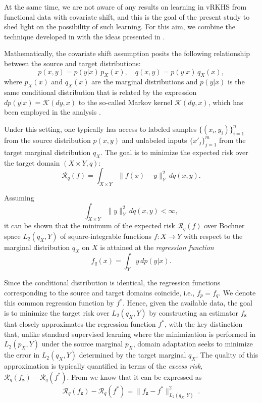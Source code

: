 \documentclass[twoside,11pt]{article}
\begin{document}
At the same time, we are not aware of any results on learning in vRKHS from functional data with covariate shift, and this is the goal of the present study to shed light on the possibility of such learning. For this aim, we combine the technique developed in  \cite{meunier2024optimal} with the ideas presented in \cite{Profsergie2022}.

Mathematically, the covariate shift assumption posits the following relationship between the source and target distributions:
\[
 p(x,y) = p(y|x) \, p_X(x), \quad
    q(x,y) = p(y | x) \, q_X(x),
\]
where \( p_X(x) \) and \( q_X(x) \) are the marginal distributions and \( p(y|x) \) is the same conditional distribution  that is related by the expression $dp(y| x) = \mathcal{K}(dy, x)$ to the so-called Markov kernel $\mathcal{K}(dy, x)$, which has been employed in the analysis \cite{meunier2024optimal}.

Under this setting, one typically has access to labeled samples \(\{(x_i, y_i)\}_{i=1}^n\) from the source distribution \(p(x,y)\) and unlabeled inputs \(\{x'_j\}_{j=1}^m\) from the target marginal distribution \(q_X\). The goal is to minimize the expected risk over the target domain $(X\times Y, q)$:
\begin{equation}\label{eq:targetrisk}
\mathcal{R}_q(f) 
= \int_{X \times Y} \big\|f(x)-y\big\|_Y^2 \, dq(x,y).
\end{equation}


\noindent
Assuming
\[
    \int_{X \times Y} \|y\|_Y^2 \, dq(x,y) < \infty,
\]
it can be shown that the minimum of the expected risk $\mathcal{R}_q(f)$ over  Bochner space $L_2(q_X,Y)$ of square-integrable functions
$f : X \to Y$ with respect to the marginal distribution $q_X$ on $X$ is attained at the \emph{regression function}
\[
    f_q(x) = \int_Y y \, dp(y| x).
\]
\vspace{0.3em}



Since the conditional distribution is identical,
the  regression functions corresponding to the source and target domains coincide, i.e., $f_p = f_q$.
We denote this common regression function by $f^*$.
Hence, given the available data, the goal is to minimize the target risk
over $L_2(q_X,Y)$ by constructing an estimator $f_\mathbf{z}$ that closely approximates
the regression function $f^*$, with the key distinction that, unlike standard
supervised learning where the minimization is performed in $L_2(p_X,Y)$ under
the source marginal $p_X$, domain adaptation seeks to minimize the error in
$L_2(q_X,Y)$ determined by the target marginal $q_X$. The quality of this approximation is typically quantified in
terms of the \emph{excess risk}, $\mathcal{R}_q(f_\mathbf{z}) - \mathcal{R}_q(f^*)$. From \cite{devito(2007)} we know that it can be expressed as
\[
\mathcal{R}_q(f_\mathbf{z}) - \mathcal{R}_q(f^*)
= \big\|f_\mathbf{z} - f^*\big\|_{L_2(q_X,Y)}^2 \; .
\]
\end{document}
